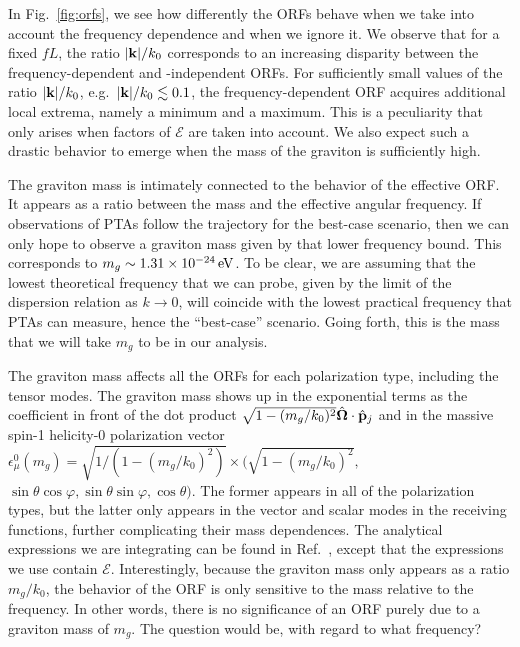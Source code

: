 \documentclass[prd,twocolumn,aps,psfig,nofootinbib,nobibnotes,superscriptaddress,preprintnumbers,times]{revtex4-2}
\newcommand{\eV}{\,{\rm eV}}
\begin{document}
In Fig.\ \ref{fig:orfs}, we see how differently the ORFs behave when we take into account the frequency dependence and when we ignore it. We observe that for a fixed $fL$, the ratio $|{\bf k}|/k_0$ corresponds to an increasing disparity between the frequency-dependent and -independent ORFs. For sufficiently small values of the ratio $|{\bf k}|/k_0$, e.g.\ $|{\bf k}|/k_0 \lesssim 0.1$, the frequency-dependent ORF acquires additional local extrema, namely a minimum and a maximum. This is a peculiarity that only arises when factors of $\mathcal{E}$ are taken into account. We also expect such a drastic behavior to emerge when the mass of the graviton is sufficiently high.

The graviton mass is intimately connected to the behavior of the effective ORF. It appears as a ratio between the mass and the effective angular frequency.
If observations of PTAs follow the trajectory for the best-case scenario, then we can only hope to observe a graviton mass given by that lower frequency bound. This corresponds to $m_g \sim 1.31\times 10^{-24} \eV$. To be clear, we are assuming that the lowest theoretical frequency that we can probe, given by the limit of the dispersion relation as $k\rightarrow 0$, will coincide with the lowest practical frequency that PTAs can measure, hence the ``best-case'' scenario. Going forth, this is the mass that we will take $m_g$ to be in our analysis.

The graviton mass affects all the ORFs for each polarization type, including the tensor modes. The graviton mass shows up in the exponential terms as the coefficient in front of the dot product $\sqrt{1 - (m_g/k_0)^2}\hat{\bf \Omega}\cdot \hat{\bf p}_j$ and in the massive spin-1 helicity-0 polarization vector $\epsilon_\mu^0(m_g) = \sqrt{1 / (1 - (m_g/k_0)^2)}\times (\sqrt{1 - (m_g/k_0)^2},$ $\sin\theta\cos\varphi, \sin\theta\sin\varphi, \cos\theta)$. The former appears in all of the polarization types, but the latter only appears in the vector and scalar modes in the receiving functions, further complicating their mass dependences. The analytical expressions we are integrating can be found in Ref.\ \cite{Liang:2021bct}, except that the expressions we use contain $\mathcal{E}$. Interestingly, because the graviton mass only appears as a ratio $m_g / k_0$, the behavior of the ORF is only sensitive to the mass relative to the frequency. In other words, there is no significance of an ORF purely due to a graviton mass of $m_g$. The question would be, with regard to what frequency?
\end{document}
